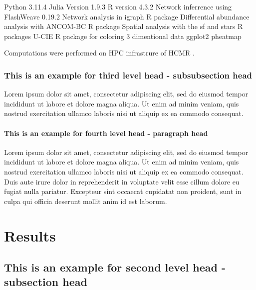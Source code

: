 \documentclass[unnumsec,webpdf,contemporary,large]{oup-authoring-template}%
\theoremstyle{thmstyleone}%
\theoremstyle{thmstyletwo}%
\theoremstyle{thmstylethree}%
\begin{document}
Python 3.11.4
Julia Version 1.9.3 \citep{Julia-2017}
R version 4.3.2 \citep{rcoreteam}
Network inferrence using FlashWeave 0.19.2 \citep{Tackmann2019}
Network analysis in igraph R package \citep{Csardi2006}
Differential abundance analysis with ANCOM-BC R package \citep{Lin2020}
Spatial analysis with the sf and stars R packages \citep{Pebesma2023}
U-CIE R package for coloring 3 dimentional data \citep{Koutrouli2022}
ggplot2 \citep{ggplot22016}
pheatmap \citep{Kolde2019}

Computations were performed on HPC infrastrure of HCMR \citep{Zafeiropoulos2021}.

\subsubsection{This is an example for third level head - subsubsection head}\label{subsubsec1}

Lorem ipsum dolor sit amet, consectetur adipiscing elit, sed do
eiusmod tempor incididunt ut labore et dolore magna aliqua. Ut enim ad minim veniam, quis nostrud exercitation ullamco laboris nisi ut aliquip ex ea commodo consequat. %

\paragraph{This is an example for fourth level head - paragraph head}

Lorem ipsum dolor sit amet, consectetur adipiscing elit, sed do eiusmod tempor incididunt ut labore et dolore magna aliqua. Ut enim ad minim veniam, quis nostrud exercitation ullamco laboris nisi ut aliquip ex ea commodo consequat. Duis aute irure dolor in reprehenderit in voluptate velit esse cillum dolore eu fugiat nulla pariatur. Excepteur sint occaecat cupidatat non proident, sunt in culpa qui officia deserunt mollit anim id est laborum.

\section{Results}\label{results}

\subsection{This is an example for second level head - subsection head}\label{subsec2}
\end{document}
